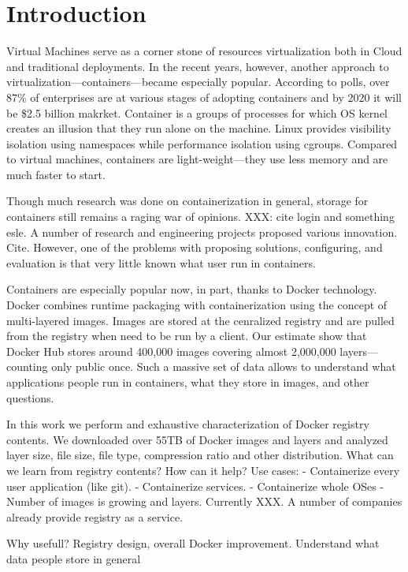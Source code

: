\section{Introduction}


%

Virtual Machines serve as a corner stone of resources virtualization both in
Cloud and traditional deployments.
%
In the recent years, however, another approach to
virtualization---containers---became especially popular.
%
According to polls, over 87\% of enterprises are at various stages of adopting
containers and by 2020 it will be \$2.5 billion makrket.
%
Container is a groups of processes for which OS kernel
creates an illusion that they run alone on the machine.
%
Linux provides visibility isolation using namespaces
while performance isolation using cgroups.
%
Compared to virtual machines, containers are
light-weight---they use less memory and are much faster to start.


Though much research was done on containerization in general,
storage for containers still remains a raging war of opinions.
XXX: cite login and something esle.
%
A number of research and engineering projects proposed
various innovation. Cite.
%
However, one of the problems with proposing solutions,
configuring, and evaluation is that very little known
what user run in containers.


Containers are especially popular now, in part, thanks
to Docker technology.
%
Docker combines runtime packaging with containerization
using the concept of multi-layered images.
%
Images are stored at the cenralized registry
and are pulled from the registry when need to be run by a client.
%
Our estimate show that Docker Hub stores around 400,000 images
covering almost 2,000,000 layers---counting only public once.
%
Such a massive set of data allows to understand what applications
people run in containers, what they store in images, and other questions.


In this work we perform and exhaustive characterization of Docker registry
contents.
%
We downloaded over 55TB of Docker images and layers and analyzed layer size,
file size, file type, compression ratio and other distribution.
%
What can we learn from registry contents? How can it help?
%
Use cases: 
- Containerize every user application (like git).
- Containerize services.
- Containerize whole OSes - 
%
Number of images is growing and layers. Currently XXX.
%
A number of companies already provide registry as a service.

Why usefull?  Registry design, overall Docker improvement.
Understand what data people store in general
